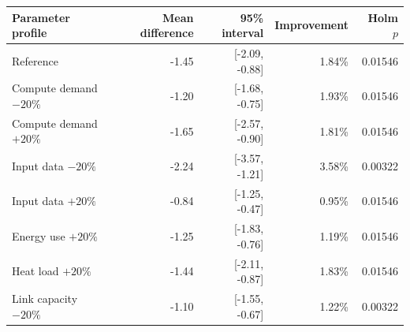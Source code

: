 \begin{tabular}{lrrrr}
\toprule
Parameter profile & Mean difference & 95\% interval & Improvement & Holm $p$ \\
\midrule
Reference & -1.45 & [-2.09, -0.88] & 1.84\% & 0.01546 \\
Compute demand $-20\%$ & -1.20 & [-1.68, -0.75] & 1.93\% & 0.01546 \\
Compute demand $+20\%$ & -1.65 & [-2.57, -0.90] & 1.81\% & 0.01546 \\
Input data $-20\%$ & -2.24 & [-3.57, -1.21] & 3.58\% & 0.00322 \\
Input data $+20\%$ & -0.84 & [-1.25, -0.47] & 0.95\% & 0.01546 \\
Energy use $+20\%$ & -1.25 & [-1.83, -0.76] & 1.19\% & 0.01546 \\
Heat load $+20\%$ & -1.44 & [-2.11, -0.87] & 1.83\% & 0.01546 \\
Link capacity $-20\%$ & -1.10 & [-1.55, -0.67] & 1.22\% & 0.00322 \\
\bottomrule
\end{tabular}